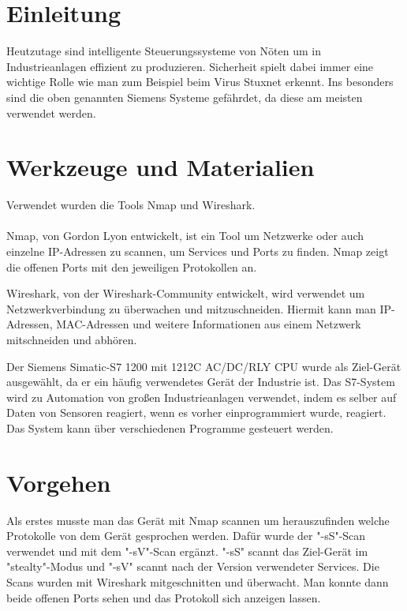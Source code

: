 \section{Einleitung}

Heutzutage sind intelligente Steuerungssysteme von Nöten um in Industrieanlagen effizient zu produzieren.
Sicherheit spielt dabei immer eine wichtige Rolle wie man zum Beispiel beim Virus Stuxnet erkennt.
Ins besonders sind die oben genannten Siemens Systeme gefährdet, da diese am meisten verwendet werden.

\section{Werkzeuge und Materialien}

Verwendet wurden die Tools Nmap und Wireshark.\\
\\
 Nmap, von Gordon Lyon entwickelt, ist ein Tool um Netzwerke oder auch einzelne IP-Adressen zu scannen, um Services und Ports zu finden. 
Nmap zeigt die offenen Ports mit den jeweiligen Protokollen an.
	  
 Wireshark, von der Wireshark-Community entwickelt, wird verwendet um Netzwerkverbindung zu überwachen und mitzuschneiden.
 Hiermit kann man IP-Adressen, MAC-Adressen und weitere Informationen aus einem Netzwerk mitschneiden und abhören.

 Der Siemens Simatic-S7 1200 mit 1212C AC/DC/RLY CPU wurde als Ziel-Gerät ausgewählt, da er ein häufig verwendetes Gerät der Industrie ist. 
Das S7-System wird zu Automation von großen Industrieanlagen verwendet, indem es selber auf Daten von Sensoren reagiert, wenn es vorher einprogrammiert wurde, reagiert.
Das System kann über verschiedenen Programme gesteuert werden.



\cite{RUB}
\cite{beuth}



\section{Vorgehen}
\label{sec:figs}
Als erstes musste man das Gerät mit Nmap scannen um herauszufinden welche Protokolle von dem Gerät gesprochen werden.
Dafür wurde der "-sS"-Scan verwendet und mit dem "-sV"-Scan ergänzt.
"-sS" scannt das Ziel-Gerät im "stealty"-Modus und "-sV" scannt nach der Version verwendeter Services.
Die Scans wurden mit Wireshark mitgeschnitten und überwacht. Man konnte dann beide offenen Ports sehen und das Protokoll sich anzeigen lassen.

